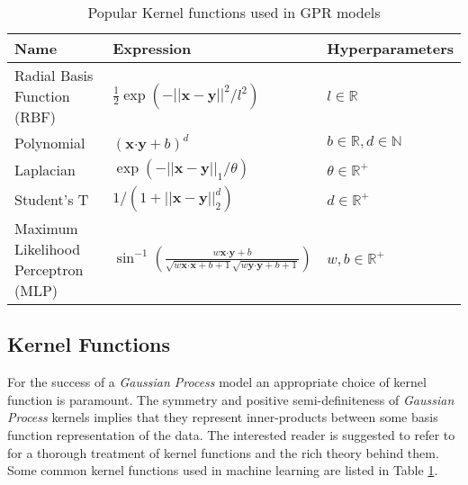 \begin{table}[h]
    \caption{Popular Kernel functions used in GPR models}
    \centering
    \begin{tabular}{l l l}
    \hline
     \textbf{Name}  & \textbf{Expression} & \textbf{Hyperparameters}  \\
    \hline
      {\small Radial Basis Function (RBF)}  & ${\scriptstyle \frac{1}{2} \exp(-||\mathbf{x} - \mathbf{y}||^2/l^2)}$  & ${\scriptstyle l \in \mathbb{R}}$   \\
      
      {\small Polynomial}  & ${\scriptstyle (\mathbf{x}\boldsymbol{\cdot} \mathbf{y} + b)^d}$ & ${\scriptstyle b \in \mathbb{R}, d \in \mathbb{N}}$   \\
      
      {\small Laplacian}  & ${\scriptstyle \exp(-||\mathbf{x} - \mathbf{y}||_{1}/\theta)}$  & ${\scriptstyle \theta \in \mathbb{R}^+}$  \\
      
      {\small Student's T}  & ${\scriptstyle 1/(1 + ||\mathbf{x} - \mathbf{y}||_{2}^d)}$ & ${\scriptstyle d \in \mathbb{R}^{+}}$\\
      
      {\small Maximum Likelihood Perceptron (MLP)}  & ${\scriptstyle \sin^{-1}\left(\frac{w\mathbf{x}\boldsymbol{\cdot} \mathbf{y} + b}{\sqrt{w\mathbf{x}\boldsymbol{\cdot} \mathbf{x} + b + 1} \sqrt{w\mathbf{y}\boldsymbol{\cdot} \mathbf{y} + b + 1}}\right)}$ & ${\scriptstyle w, b \in \mathbb{R}^{+}}$\\
    \hline
    \end{tabular}
    \label{table:kernel}
\end{table}
    
\subsection{Kernel Functions}

For the success of a \emph{Gaussian Process} model an appropriate choice of kernel function is paramount. The symmetry and positive semi-definiteness of \emph{Gaussian Process} kernels implies that they represent inner-products between some basis function representation of the data. The interested reader is suggested to refer to \citet{Berlinet2004,Scholkopf:2001:LKS:559923,hofmann2008} for a thorough treatment of kernel functions and the rich theory behind them. Some common kernel functions used in machine learning are listed in Table \ref{table:kernel}. 

